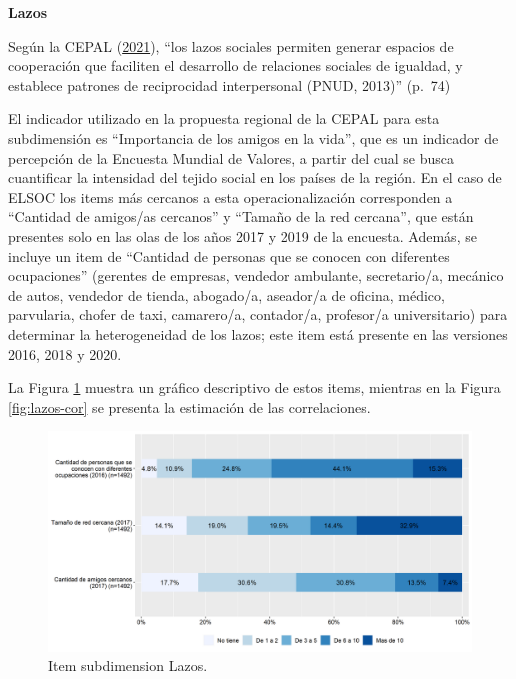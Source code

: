 \documentclass[
  12pt,
]{book}
\begin{document}
\textbf{Lazos}

Según la CEPAL (\protect\hyperlink{ref-cepal_cohesion_2021}{2021}), ``los lazos sociales permiten generar espacios de cooperación que faciliten el desarrollo de relaciones sociales de igualdad, y establece patrones de reciprocidad interpersonal (PNUD, 2013)'' (p.~74)

El indicador utilizado en la propuesta regional de la CEPAL para esta subdimensión es ``Importancia de los amigos en la vida'', que es un indicador de percepción de la Encuesta Mundial de Valores, a partir del cual se busca cuantificar la intensidad del tejido social en los países de la región. En el caso de ELSOC los items más cercanos a esta operacionalización corresponden a ``Cantidad de amigos/as cercanos'' y ``Tamaño de la red cercana'', que están presentes solo en las olas de los años 2017 y 2019 de la encuesta. Además, se incluye un item de ``Cantidad de personas que se conocen con diferentes ocupaciones'' (gerentes de empresas, vendedor ambulante, secretario/a, mecánico de autos, vendedor de tienda, abogado/a, aseador/a de oficina, médico, parvularia, chofer de taxi, camarero/a, contador/a, profesor/a universitario) para determinar la heterogeneidad de los lazos; este item está presente en las versiones 2016, 2018 y 2020.

La Figura \ref{fig:lazos} muestra un gráfico descriptivo de estos items, mientras en la Figura \ref{fig:lazos-cor} se presenta la estimación de las correlaciones.

\begin{figure}[H]

{\centering \includegraphics[width=1\linewidth,height=1\textheight]{output/graphs/lazos} 

}

\caption{Item subdimension Lazos.}\label{fig:lazos}
\end{figure}
\end{document}

